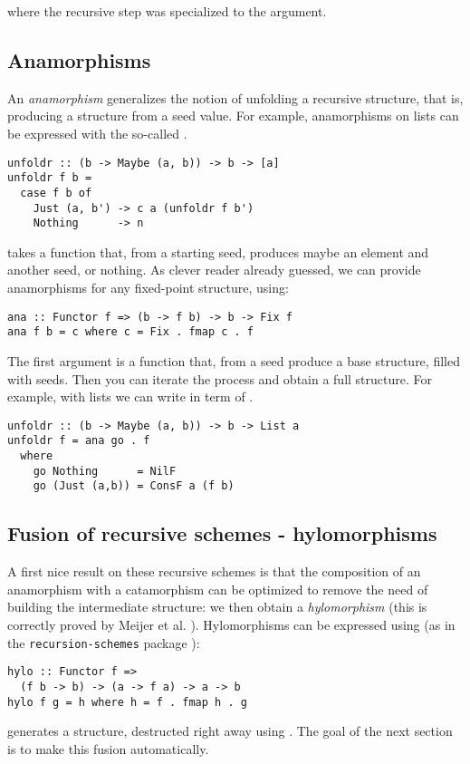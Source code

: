 \noindent
where the recursive step was specialized to the  argument.

\subsection{Anamorphisms}
An \emph{anamorphism} generalizes the notion of unfolding a recursive structure, that is, producing a structure from a seed value.
For example, anamorphisms on lists can be expressed with the so-called .
\begin{verbatim}
unfoldr :: (b -> Maybe (a, b)) -> b -> [a]
unfoldr f b =
  case f b of
    Just (a, b') -> c a (unfoldr f b')
    Nothing      -> n
\end{verbatim}

\noindent {} takes a function that, from a starting seed, produces maybe an element and another seed, or nothing. As clever reader already guessed, we can provide anamorphisms for any fixed-point structure, using:
\begin{verbatim}
ana :: Functor f => (b -> f b) -> b -> Fix f
ana f b = c where c = Fix . fmap c . f
\end{verbatim}
The first argument is a function that, from a seed produce a base structure, filled with seeds. Then you can iterate the process and obtain a full structure. For example, with lists we can write  in term of .
\begin{verbatim}
unfoldr :: (b -> Maybe (a, b)) -> b -> List a
unfoldr f = ana go . f
  where
    go Nothing      = NilF
    go (Just (a,b)) = ConsF a (f b)
\end{verbatim}

\subsection{Fusion of recursive schemes - hylomorphisms}
A first nice result on these recursive schemes is that the composition of an anamorphism with a catamorphism can be optimized to remove the need of building the intermediate structure: we then obtain a \emph{hylomorphism} (this is correctly proved by Meijer et al. \cite{4cec4a43c86444479dc0003182424795}).
Hylomorphisms can be expressed using  (as in the \verb|recursion-schemes| package \cite{ekmett:eschems}):
\begin{verbatim}
hylo :: Functor f =>
  (f b -> b) -> (a -> f a) -> a -> b
hylo f g = h where h = f . fmap h . g
\end{verbatim}
\noindent {} generates a structure, destructed right away using .
The goal of the next section is to make this fusion automatically.